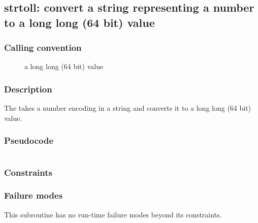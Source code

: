 \clearpage
{}
{}
\label{subr:strtoll}
\subsection*{strtoll: convert a string representing a number to a
  long long (64 bit) value}

\subsubsection*{Calling convention}

\begin{description}
\item[] a long long (64 bit) value
\end{description}

\subsubsection*{Description}

The  takes a number encoding in a string and
converts it to a long long (64 bit) value.

\subsubsection*{Pseudocode}

\begin{verbatim}
\end{verbatim}

\subsubsection*{Constraints}

\subsubsection*{Failure modes}

This subroutine has no run-time failure modes beyond its constraints.
